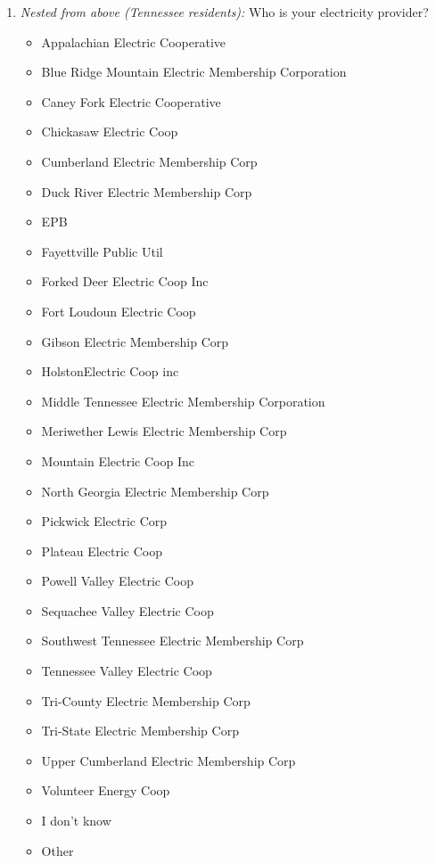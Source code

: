 \documentclass{article}
\begin{document}
\begin{enumerate}
\item \textit{Nested from above (Tennessee residents):} Who is your electricity provider?
\begin{itemize}
  \item[\checkbox] Appalachian Electric Cooperative
  \item[\checkbox] Blue Ridge Mountain Electric Membership Corporation
  \item[\checkbox] Caney Fork Electric Cooperative
  \item[\checkbox] Chickasaw Electric Coop
  \item[\checkbox] Cumberland Electric Membership Corp
  \item[\checkbox] Duck River Electric Membership Corp
  \item[\checkbox] EPB
  \item[\checkbox] Fayettville Public Util
  \item[\checkbox] Forked Deer Electric Coop Inc
  \item[\checkbox] Fort Loudoun Electric Coop
  \item[\checkbox] Gibson Electric Membership Corp
  \item[\checkbox] HolstonElectric Coop inc
  \item[\checkbox] Middle Tennessee Electric Membership Corporation
  \item[\checkbox] Meriwether Lewis Electric Membership Corp
  \item[\checkbox] Mountain Electric Coop Inc
  \item[\checkbox] North Georgia Electric Membership Corp
  \item[\checkbox] Pickwick Electric Corp
  \item[\checkbox] Plateau Electric Coop
  \item[\checkbox] Powell Valley Electric Coop
  \item[\checkbox] Sequachee Valley Electric Coop
  \item[\checkbox] Southwest Tennessee Electric Membership Corp
  \item[\checkbox] Tennessee Valley Electric Coop
  \item[\checkbox] Tri-County Electric Membership Corp
  \item[\checkbox] Tri-State Electric Membership Corp
  \item[\checkbox] Upper Cumberland Electric Membership Corp
  \item[\checkbox] Volunteer Energy Coop
  \item[\checkbox] I don't know
  \item[\checkbox] Other
\end{itemize}
 


\end{enumerate}
\end{document}
